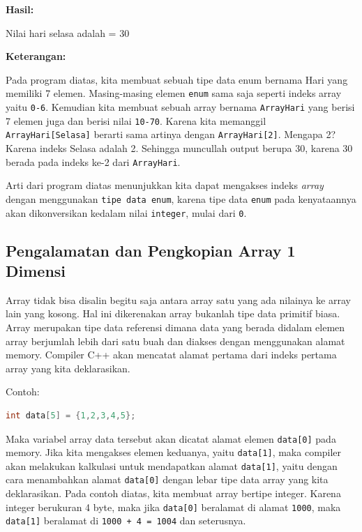 \textbf{Hasil:}

\begin{lcverbatim}
Nilai hari selasa adalah = 30
\end{lcverbatim}

\textbf{Keterangan:}

Pada program diatas, kita membuat sebuah tipe data enum bernama Hari
yang memiliki 7 elemen. Masing-masing elemen \texttt{enum} sama saja
seperti indeks array yaitu \texttt{0-6}. Kemudian kita membuat sebuah
array bernama \texttt{ArrayHari} yang berisi 7 elemen juga dan berisi
nilai \texttt{10-70}. Karena kita memanggil \\
\texttt{ArrayHari{[}Selasa{]}} berarti sama artinya dengan
\texttt{ArrayHari{[}2{]}}. Mengapa 2? Karena indeks Selasa adalah 2.
Sehingga muncullah output berupa 30, karena 30 berada pada indeks ke-2
dari \texttt{ArrayHari}.

Arti dari program diatas menunjukkan kita dapat mengakses indeks
\emph{array} dengan menggunakan \texttt{tipe\ data\ enum}, karena tipe
data \texttt{enum} pada kenyataannya akan dikonversikan kedalam nilai
\texttt{integer}, mulai dari \texttt{0}.

\subsection{Pengalamatan dan Pengkopian Array 1
Dimensi}\label{pengalamatan-dan-pengkopian-array-1-dimensi}

Array tidak bisa disalin begitu saja antara array satu yang ada nilainya
ke array lain yang kosong. Hal ini dikerenakan array bukanlah tipe data
primitif biasa. Array merupakan tipe data referensi dimana data yang
berada didalam elemen array berjumlah lebih dari satu buah dan diakses
dengan menggunakan alamat memory. Compiler C++ akan mencatat alamat
pertama dari indeks pertama array yang kita deklarasikan.

Contoh:

\begin{lstlisting}[language=c++, numbers=none]
int data[5] = {1,2,3,4,5};
\end{lstlisting}

Maka variabel array data tersebut akan dicatat alamat elemen
\texttt{data{[}0{]}} pada memory. Jika kita mengakses elemen keduanya,
yaitu \texttt{data{[}1{]}}, maka compiler akan melakukan kalkulasi untuk
mendapatkan alamat \texttt{data{[}1{]}}, yaitu dengan cara menambahkan
alamat \texttt{data{[}0{]}} dengan lebar tipe data array yang kita
deklarasikan. Pada contoh diatas, kita membuat array bertipe integer.
Karena integer berukuran 4 byte, maka jika \texttt{data{[}0{]}}
beralamat di alamat \texttt{1000}, maka \texttt{data{[}1{]}} beralamat
di \texttt{1000\ +\ 4\ =\ 1004} dan seterusnya.

